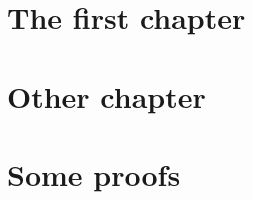 \documentclass[12pt,dvips]{report}
\title{}
\author{}
\date{}
\begin{document}
\maketitle
\tableofcontents

\chapter{The first chapter}
\section{}
\subsection{}

\chapter{Other chapter}

\appendix
\chapter{Some proofs}



\printindex
\end{document}
